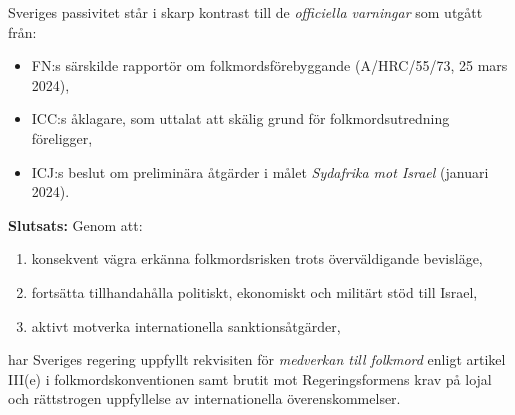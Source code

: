 
Sveriges passivitet står i skarp kontrast till de \textit{officiella varningar} som utgått från:

\begin{itemize}
    \item FN:s särskilde rapportör om folkmordsförebyggande (A/HRC/55/73, 25 mars 2024),
    \item ICC:s åklagare, som uttalat att skälig grund för folkmordsutredning föreligger,
    \item ICJ:s beslut om preliminära åtgärder i målet \textit{Sydafrika mot Israel} (januari 2024).
\end{itemize}

\vspace{0.5cm}
\textbf{Slutsats:} Genom att:

\begin{enumerate}
    \item konsekvent vägra erkänna folkmordsrisken trots överväldigande bevisläge,
    \item fortsätta tillhandahålla politiskt, ekonomiskt och militärt stöd till Israel,
    \item aktivt motverka internationella sanktionsåtgärder,
\end{enumerate}

har Sveriges regering uppfyllt rekvisiten för \textit{medverkan till folkmord} enligt artikel III(e) i folkmordskonventionen samt brutit mot Regeringsformens krav på lojal och rättstrogen uppfyllelse av internationella överenskommelser.
